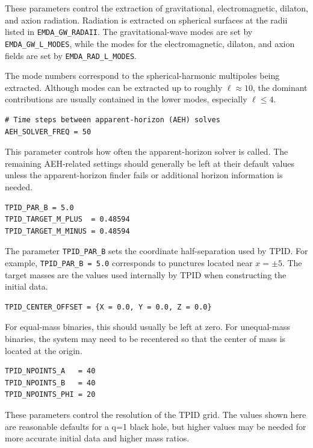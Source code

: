 These parameters control the extraction of gravitational, electromagnetic,
dilaton, and axion radiation. Radiation is extracted on spherical surfaces at
the radii listed in \texttt{EMDA\_GW\_RADAII}. The gravitational-wave modes are
set by \texttt{EMDA\_GW\_L\_MODES}, while the modes for the electromagnetic,
dilaton, and axion fields are set by \texttt{EMDA\_RAD\_L\_MODES}.

The mode numbers correspond to the spherical-harmonic multipoles being
extracted. Although modes can be extracted up to roughly $\ell \approx 10$, the
dominant contributions are usually contained in the lower modes, especially
$\ell \leq 4$.

\begin{verbatim}
# Time steps between apparent-horizon (AEH) solves
AEH_SOLVER_FREQ = 50
\end{verbatim}

This parameter controls how often the apparent-horizon solver is called. The
remaining AEH-related settings should generally be left at their default values
unless the apparent-horizon finder fails or additional horizon information is
needed.

\begin{verbatim}
TPID_PAR_B = 5.0
TPID_TARGET_M_PLUS  = 0.48594
TPID_TARGET_M_MINUS = 0.48594
\end{verbatim}

The parameter \texttt{TPID\_PAR\_B} sets the coordinate half-separation used by
TPID. For example, \texttt{TPID\_PAR\_B = 5.0} corresponds to punctures located
near $x=\pm 5$. The target masses are the values used internally by TPID when
constructing the initial data.

\begin{verbatim}
TPID_CENTER_OFFSET = {X = 0.0, Y = 0.0, Z = 0.0}
\end{verbatim}

For equal-mass binaries, this should usually be left at zero. For unequal-mass
binaries, the system may need to be recentered so that the center of mass is
located at the origin.

\begin{verbatim}
TPID_NPOINTS_A   = 40
TPID_NPOINTS_B   = 40
TPID_NPOINTS_PHI = 20
\end{verbatim}

These parameters control the resolution of the TPID grid. The values shown here
are reasonable defaults for a q=1 black hole, but higher values may be needed for
more accurate initial data and higher mass ratios.

